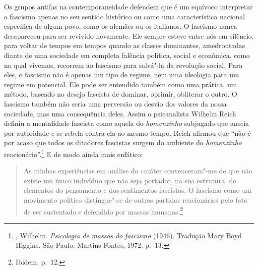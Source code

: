 Os grupos antifas na contemporaneidade defendem que é um equívoco
interpretar o fascismo apenas no seu sentido histórico ou como uma
característica nacional específica de algum povo, como os alemães ou os
italianos. O fascismo nunca desapareceu para ser revivido novamente. Ele
sempre esteve entre nós em silêncio, para voltar de tempos em tempos
quando as classes dominantes, amedrontadas diante de uma sociedade em completa
falência política, social e econômica, como na qual vivemos, recorrem ao
fascismo para salvá"-la da revolução social. Para eles, o fascismo não é
apenas um tipo de regime, nem uma ideologia para um regime em potencial.
Ele pode ser entendido também como uma prática, um método, baseado no
desejo fascista de dominar, oprimir, obliterar o outro. O fascismo
também não seria uma perversão ou desvio dos valores da nossa sociedade,
mas uma consequência deles. Assim o psicanalista Wilhelm Reich definiu
a mentalidade fascista como aquela do \emph{homenzinho} subjugado
que anseia por autoridade e se rebela contra ela ao mesmo tempo. Reich
afirmou que ``não é por acaso que todos os ditadores fascistas surgem do
ambiente do \emph{homenzinho} reacionário''.\footnote{
  , Wilhelm. \emph{Psicologia de massas do fascismo} (1946). Tradução
  Mary Boyd Higgins. São Paulo: Martins Fontes, 1972, p.~13.} E de modo ainda mais enfático:

\begin{quote}
As minhas experiências em análise do caráter convenceram"-me de que não
existe um único indivíduo que não seja portador, na sua estrutura, de
elementos do pensamento e dos sentimentos fascistas. O fascismo como um
movimento político distingue"-se de outros partidos reacionários pelo
fato de ser sustentado e defendido por massas humanas.\footnote{Ibidem,
  p.~12.}
\end{quote}

